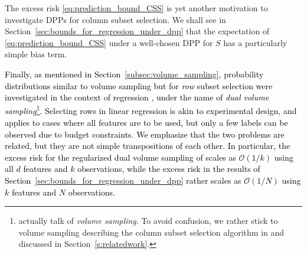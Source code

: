 \documentclass[twoside,11pt]{book}
\newcommand{\rev}[1]{\textcolor{black}{#1}}
\numberwithin{theorem}{chapter}
\numberwithin{definition}{chapter}
\numberwithin{proposition}{chapter}
\numberwithin{corollary}{chapter}
\numberwithin{example}{chapter}
\numberwithin{lemma}{chapter}
\numberwithin{assumption}{chapter}
\numberwithin{equation}{chapter}
\numberwithin{figure}{chapter}
\DeclareMathOperator{\Det}{Det}
\DeclareMathOperator{\Span}{\mathrm{Span}}
\DeclareMathOperator{\Prb}{\mathbb{P}}
\begin{document}
The excess risk \eqref{eq:prediction_bound_CSS} is yet another motivation to investigate DPPs for column subset selection. We shall see in Section~\ref{sec:bounds_for_regression_under_dpp} that the expectation of \eqref{eq:prediction_bound_CSS} under a well-chosen DPP for $S$ has a particularly simple bias term.

\rev{
Finally, as mentioned in Section~\ref{subsec:volume_sampling}, probability distributions similar to volume sampling but for \emph{row} subset selection were investigated in the context of regression \parencite{DeWa17,DeWaHs18}, under the name of \emph{dual volume sampling}\footnote{\cite{DeWa17} actually talk of \emph{volume sampling}. To avoid confusion, we rather stick to volume sampling describing the column subset selection algorithm in \parencite{DRVW06} and discussed in Section~\ref{s:relatedwork}.}. Selecting rows in linear regression is akin to experimental design, and applies to cases where all features are to be used, but only a few labels can be observed due to budget constraints. We emphasize that the two problems are related, but they are not simple transpositions of each other. In particular, the excess risk for the regularized dual volume sampling of \cite{DeWa18} scales as $\mathcal{O}(1/k)$ using all $d$ features and $k$ observations, while the excess risk in the results of Section~\ref{sec:bounds_for_regression_under_dpp} rather scales as $\mathcal{O}(1/N)$ using $k$ features and $N$ observations.
}%
%

\end{document}
